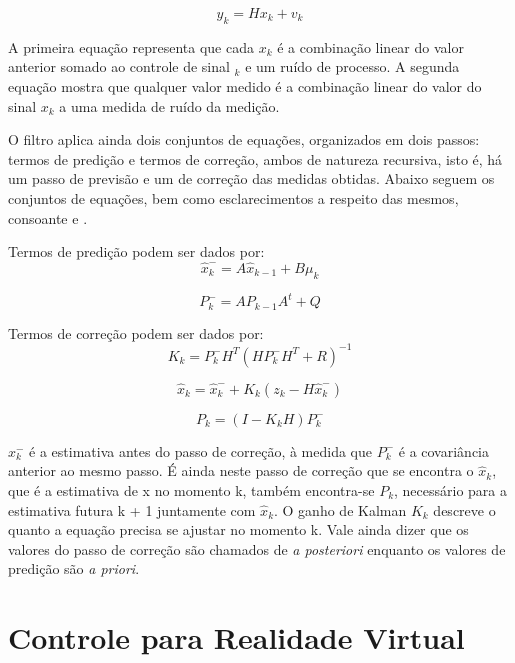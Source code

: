 \documentclass[conference]{IEEEtran}
\begin{document}
\begin{equation}
y_k = Hx_k + v_k
\end{equation}

A primeira equação representa que cada $x_k$ é a combinação linear do valor anterior somado ao controle de sinal $_k$ e um ruído de processo. A segunda equação mostra que qualquer valor medido é a combinação linear do valor do sinal $x_k$ a uma medida de ruído da medição.

O filtro aplica ainda dois conjuntos de equações, organizados em dois passos: termos de predição e termos de correção, ambos de natureza recursiva, isto é, há um passo de previsão e um de correção das medidas obtidas. Abaixo seguem os conjuntos de equações, bem como esclarecimentos a respeito das mesmos, consoante \cite{WelchBishop} e \cite{LAARAIEDH}.

Termos de predição podem ser dados por:
\begin{equation}
\hat{x}^{-}_k = A\hat{x}_{k-1} +  B\mu_k
\end{equation}

\begin{equation}
P^{-}_k = AP_{k-1}A^{t} +  Q
\end{equation}

Termos de correção podem ser dados por:
\begin{equation}
K_k = P^{-}_k H^{T} (H P^{-}_k H^{T} + R)^{-1}
\end{equation}

\begin{equation}
\hat{x}_k = \hat{x}^{-}_k + K_k (z_k - H\hat{x}^{-}_k)
\end{equation}

\begin{equation}
P_k = (I - K_kH)  P^{-}_k
\end{equation}

$x^{-}_k$ é a estimativa antes do passo de correção, à medida que $P^{-}_k$ é a covariância anterior ao mesmo passo. É ainda neste passo de correção que se encontra o $\hat{x}_k$, que é a estimativa de x no momento k, também encontra-se $P_k$, necessário para a estimativa futura k + 1 juntamente com $\hat{x}_k$. O ganho de Kalman $K_k$ descreve o quanto a equação precisa se ajustar no momento k. Vale ainda dizer que os valores do passo de correção são chamados de \textit{a posteriori} enquanto os valores de predição são \textit{a priori}.


\section{Controle para Realidade Virtual} \label{sec:vrcontroller}
\end{document}
